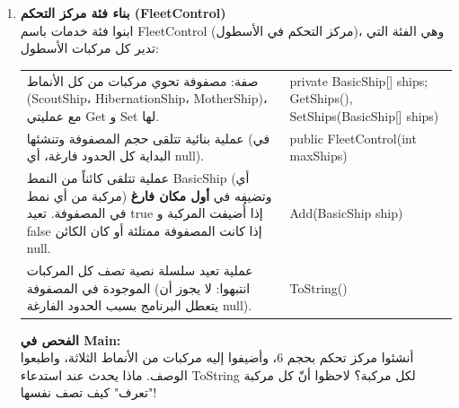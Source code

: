 \documentclass[14pt]{extarticle}
\begin{document}
\begin{enumerate}[resume, label=\textbf{تمرين \arabic*:}, wide=0pt, leftmargin=*, itemsep=2.2em]

    \item \textbf{بناء فئة مركز التحكم (\textenglish{FleetControl})} \\
    ابنوا فئة خدمات باسم \textenglish{FleetControl} (مركز التحكم في الأسطول)، وهي الفئة التي تدير كل مركبات الأسطول:

    {\centering
    \renewcommand{\arraystretch}{1.2}
    \small
    \begin{tabular}{|>{\raggedleft\arraybackslash}p{}|>{\raggedright\arraybackslash}p{}|}
    \hline
    \multicolumn{2}{|c|}{\textbf{الفئة: \textenglish{FleetControl}}} \\
    \hline
    صفة: مصفوفة تحوي مركبات من كل الأنماط (\textenglish{ScoutShip}، \textenglish{HibernationShip}، \textenglish{MotherShip})، مع عمليتي \textenglish{Get} و \textenglish{Set} لها. & \textenglish{private BasicShip[] ships;} \newline \textenglish{GetShips(), SetShips(BasicShip[] ships)} \\
    \hline
    عملية بنائية تتلقى حجم المصفوفة وتنشئها (في البداية كل الحدود فارغة، أي \textenglish{null}). & \textenglish{public FleetControl(int maxShips)} \\
    \hline
    عملية تتلقى كائناً من النمط \textenglish{BasicShip} (أي مركبة من أي نمط) وتضيفه في \textbf{أول مكان فارغ} في المصفوفة. تعيد \textenglish{true} إذا أُضيفت المركبة و \textenglish{false} إذا كانت المصفوفة ممتلئة أو كان الكائن \textenglish{null}. & \textenglish{Add(BasicShip ship)} \\
    \hline
    عملية تعيد سلسلة نصية تصف كل المركبات الموجودة في المصفوفة (انتبهوا: لا يجوز أن يتعطل البرنامج بسبب الحدود الفارغة \textenglish{null}). & \textenglish{ToString()} \\
    \hline
    \end{tabular}
    \par} %

    \vspace{2em}
    \noindent \textbf{الفحص في \textenglish{Main}:} \\
    أنشئوا مركز تحكم بحجم 6، وأضيفوا إليه مركبات من الأنماط الثلاثة، واطبعوا الوصف. ماذا يحدث عند استدعاء \textenglish{ToString} لكل مركبة؟ لاحظوا أنّ كل مركبة "تعرف" كيف تصف نفسها!


\end{enumerate}
\end{document}
